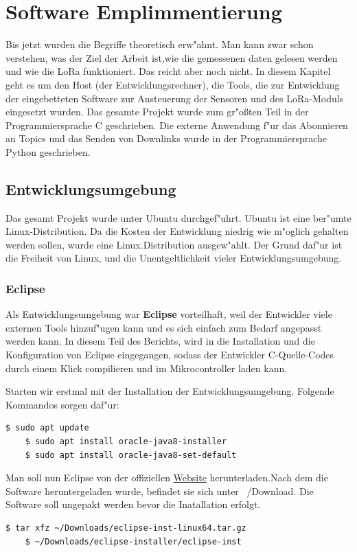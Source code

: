 \chapter{Software Emplimmentierung}\label{Soft-Ent}
Bis jetzt wurden die Begriffe theoretisch erw"ahnt. Man kann zwar schon 
verstehen, was der Ziel der Arbeit ist,wie die gemessenen daten gelesen 
werden und wie die LoRa funktioniert. Das reicht aber noch nicht. 
In diesem Kapitel geht es um den Host (der Entwicklungsrechner), die 
Tools, die zur Entwicklung der eingebetteten Software zur Ansteuerung 
der Sensoren und des LoRa-Moduls eingesetzt wurden. Das gesamte Projekt 
wurde zum gr"o\ss{}ten Teil in der Programmiersprache C geschrieben. 
Die externe Anwendung f"ur das Abonnieren an Topics und das Senden von
Downlinks wurde in der Programmiersprache Python geschrieben.

\section{Entwicklungsumgebung}
Das gesamt Projekt wurde unter Ubuntu durchgef"uhrt. Ubuntu ist eine 
ber"umte Linux-Distribution. Da die Kosten der Entwicklung niedrig wie 
m"oglich gehalten werden sollen, wurde eine Linux.Distribution 
ausgew"ahlt. Der Grund daf"ur ist die Freiheit von Linux, und die 
Unentgeltlichkeit vieler Entwicklungsumgebung. 

\subsection{Eclipse}

Als Entwicklungsumgebung war \textbf{Eclipse} vorteilhaft, weil der 
Entwickler viele externen Tools hinzuf"ugen kann und es sich einfach 
zum Bedarf angepasst werden kann. In diesem Teil des Berichts, wird in 
die Installation und die Konfiguration von Eclipse eingegangen, sodass  
der Entwickler C-Quelle-Codes durch einem Klick compilieren und im 
Mikrocontroller laden kann. 

\vspace{2cm}
Starten wir erstmal mit der Installation der Entwicklungsumgebung. 
Folgende Kommandos sorgen daf"ur:

\begin{lstlisting}[frame=single]
	$ sudo apt update
	$ sudo apt install oracle-java8-installer
	$ sudo apt install oracle-java8-set-default
\end{lstlisting}

Man soll nun Eclipse von der offiziellen
\href{https://www.eclipse.org/downloads/}{Website}  herunterladen.Nach 
dem die Software heruntergeladen wurde, befindet sie sich unter 
~/Download. Die Software soll ungepakt werden bevor die Inatallation 
erfolgt.
\begin{lstlisting}[frame=single]
	$ tar xfz ~/Downloads/eclipse-inst-linux64.tar.gz
	$ ~/Downloads/eclipse-installer/eclipse-inst
\end{lstlisting}

